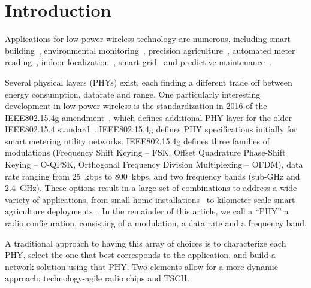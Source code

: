 \documentclass[sensors,article,submit,moreauthors,pdftex]{Definitions/mdpi}
\begin{document}
\section{Introduction}
\label{sec:introduction}


Applications for low-power wireless technology are numerous, including
    smart building~\cite{munoz18overview,kazmi14review},
    environmental monitoring~\cite{munoz18evaluation},
    precision agriculture~\cite{watteyne16peach},
    automated meter reading~\cite{sum17experimental},
    indoor localization~\cite{tanaka20blink},
    smart grid~\cite{fadel15survey} and
    predictive maintenance~\cite{civerchia17industrial}.


Several physical layers (PHYs) exist, each finding a different trade off between
    energy consumption,
    datarate and
    range.
One particularly interesting development in low-power wireless is the standardization in 2016 of the IEEE802.15.4g amendment~\cite{std_ieee802154g}, which defines additional PHY layer for the older IEEE802.15.4 standard~\cite{std_ieee802154}.
IEEE802.15.4g defines PHY specifications initially for smart metering utility networks.
IEEE802.15.4g defines
    three families of modulations (Frequency Shift Keying -- FSK,  Offset Quadrature Phase-Shift Keying -- O-QPSK, Orthogonal Frequency Division Multiplexing -- OFDM),
    data rate ranging from 25~kbps to 800~kbps, and
    two frequency bands (sub-GHz and 2.4~GHz).
These options result in a large set of combinations to address a wide variety of applications, from
    small home installations~\cite{tuset19experimental} to
    kilometer-scale smart agriculture deployments~\cite{munoz19km}.
In the remainder of this article, we call a ``PHY'' a radio configuration, consisting of
    a modulation,
    a data rate and
    a frequency band.


A traditional approach to having this array of choices is to
    characterize each PHY,
    select the one that best corresponds to the application, and
    build a network solution using that PHY.
Two elements allow for a more dynamic approach:
    technology-agile radio chips and
    TSCH.

\end{document}
